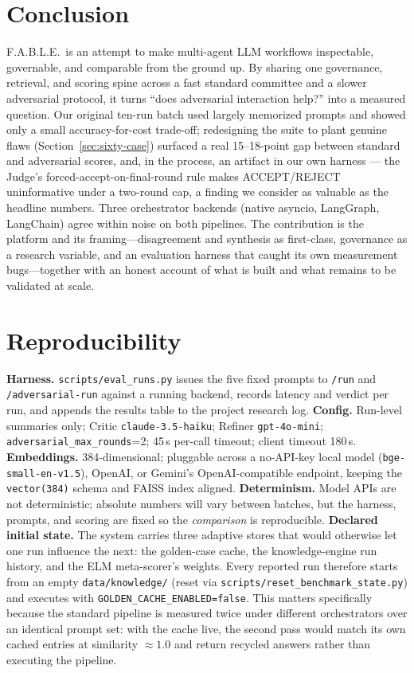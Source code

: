 \documentclass{article}
\begin{document}
\section{Conclusion}
F.A.B.L.E.\ is an attempt to make multi-agent LLM workflows inspectable, governable, and
comparable from the ground up. By sharing one governance, retrieval, and scoring spine across
a fast standard committee and a slower adversarial protocol, it turns ``does adversarial
interaction help?'' into a measured question. Our original ten-run batch used largely
memorized prompts and showed only a small accuracy-for-cost trade-off; redesigning the suite
to plant genuine flaws (Section~\ref{sec:sixty-case}) surfaced a real 15--18-point gap between
standard and adversarial scores, and, in the process, an artifact in our own harness --- the
Judge's forced-accept-on-final-round rule makes ACCEPT/REJECT uninformative under a two-round
cap, a finding we consider as valuable as the headline numbers. Three orchestrator backends
(native asyncio, LangGraph, LangChain) agree within noise on both pipelines. The contribution
is the platform and its framing---disagreement and synthesis as first-class, governance as a
research variable, and an evaluation harness that caught its own measurement bugs---together
with an honest account of what is built and what remains to be validated at scale.


% 

\appendix

\section{Reproducibility}
\textbf{Harness.} \texttt{scripts/eval\_runs.py} issues the five fixed prompts to
\texttt{/run} and \texttt{/adversarial-run} against a running backend, records latency and
verdict per run, and appends the results table to the project research log. \textbf{Config.}
Run-level summaries only; Critic \texttt{claude-3.5-haiku}; Refiner \texttt{gpt-4o-mini};
\texttt{adversarial\_max\_rounds}=2; 45\,s per-call timeout; client timeout 180\,s.
\textbf{Embeddings.} 384-dimensional; pluggable across a no-API-key local model
(\texttt{bge-small-en-v1.5}), OpenAI, or Gemini's OpenAI-compatible endpoint, keeping the
\texttt{vector(384)} schema and FAISS index aligned. \textbf{Determinism.} Model APIs are not
deterministic; absolute numbers will vary between batches, but the harness, prompts, and
scoring are fixed so the \emph{comparison} is reproducible.
\textbf{Declared initial state.} The system carries three adaptive stores that would
otherwise let one run influence the next: the golden-case cache, the knowledge-engine run
history, and the ELM meta-scorer's weights. Every reported run therefore starts from an
empty \texttt{data/knowledge/} (reset via \texttt{scripts/reset\_benchmark\_state.py}) and
executes with \texttt{GOLDEN\_CACHE\_ENABLED=false}. This matters specifically because the
standard pipeline is measured twice under different orchestrators over an identical prompt
set: with the cache live, the second pass would match its own cached entries at similarity
$\approx 1.0$ and return recycled answers rather than executing the pipeline.
\end{document}
